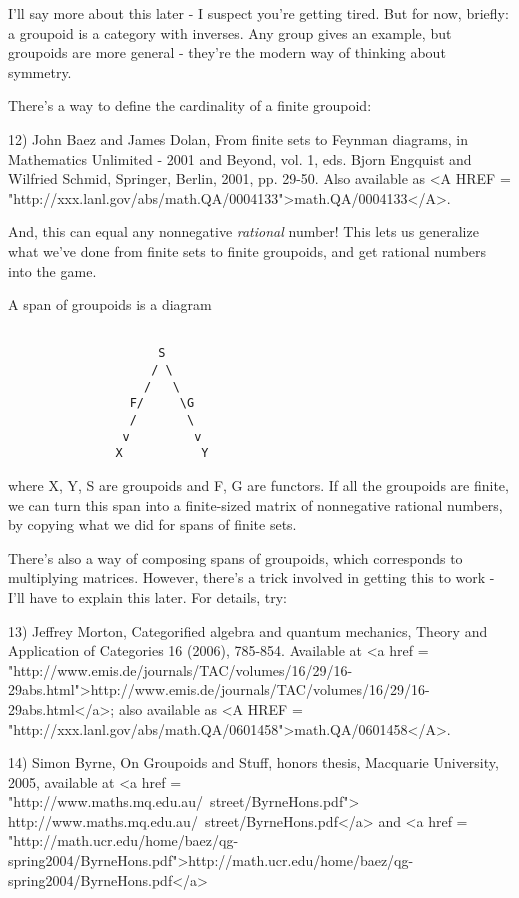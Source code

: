 I'll say more about this later - I suspect you're getting tired.
But for now, briefly: a groupoid is a category with inverses.  Any
group gives an example, but groupoids are more general - they're the
modern way of thinking about symmetry.

There's a way to define the cardinality of a finite groupoid:

12) John Baez and James Dolan, From finite sets to Feynman diagrams,
in Mathematics Unlimited - 2001 and Beyond, vol. 1, eds. Bjorn Engquist 
and Wilfried Schmid, Springer, Berlin, 2001, pp. 29-50.  Also available
as <A HREF = "http://xxx.lanl.gov/abs/math.QA/0004133">math.QA/0004133</A>.

And, this can equal any nonnegative \emph{rational} number!  This lets us
generalize what we've done from finite sets to finite groupoids, and
get rational numbers into the game.

A span of groupoids is a diagram


\begin{verbatim}

                     S
                    / \
                   /   \
                 F/     \G
                 /       \
                v         v 
               X           Y
\end{verbatim}
    
where X, Y, S are groupoids and F, G are functors.  If all the groupoids
are finite, we can turn this span into a finite-sized matrix of nonnegative 
rational numbers, by copying what we did for spans of finite sets.  

There's also a way of composing spans of groupoids, which corresponds 
to multiplying matrices.  However, there's a trick involved in getting
this to work - I'll have to explain this later.  For details, try:

13) Jeffrey Morton, Categorified algebra and quantum mechanics, 
Theory and Application of Categories 16 (2006), 785-854.  Available
at 
<a href = "http://www.emis.de/journals/TAC/volumes/16/29/16-29abs.html">http://www.emis.de/journals/TAC/volumes/16/29/16-29abs.html</a>; 
also available as <A HREF = "http://xxx.lanl.gov/abs/math.QA/0601458">math.QA/0601458</A>.

14) Simon Byrne, On Groupoids and Stuff, honors thesis, Macquarie
University, 2005, available at 
<a href = "http://www.maths.mq.edu.au/~street/ByrneHons.pdf">
http://www.maths.mq.edu.au/~street/ByrneHons.pdf</a> and
<a href = "http://math.ucr.edu/home/baez/qg-spring2004/ByrneHons.pdf">http://math.ucr.edu/home/baez/qg-spring2004/ByrneHons.pdf</a>


